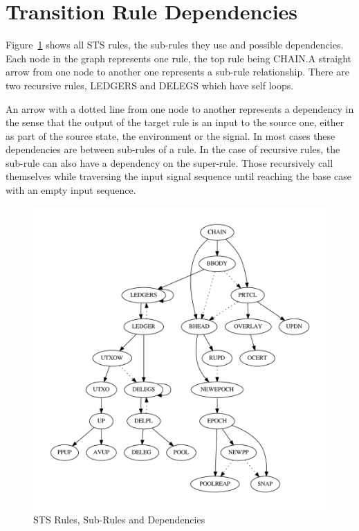 \section{Transition Rule Dependencies}
\label{sec:sts-rules-overview}

Figure~\ref{fig:sts-rules-dependencies} shows all STS rules, the sub-rules they
use and possible dependencies. Each node in the graph represents one rule, the
top rule being CHAIN.\@ A straight arrow from one node to another one represents
a sub-rule relationship. There are two recursive rules, LEDGERS and DELEGS which
have self loops.

An arrow with a dotted line from one node to another represents a dependency in
the sense that the output of the target rule is an input to the source one,
either as part of the source state, the environment or the signal. In most cases
these dependencies are between sub-rules of a rule. In the case of recursive
rules, the sub-rule can also have a dependency on the super-rule. Those
recursively call themselves while traversing the input signal sequence until
reaching the base case with an empty input sequence.

\begin{figure}[htp]
  \centering
  \includegraphics[width=\textwidth]{rules}
  \caption{STS Rules, Sub-Rules and Dependencies}
  \label{fig:sts-rules-dependencies}
\end{figure}

